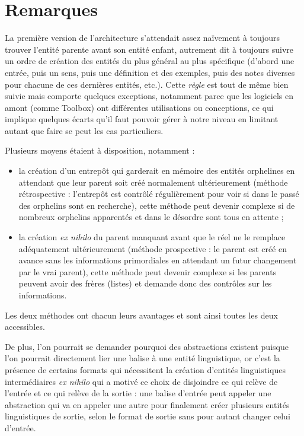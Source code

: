\documentclass[10pt]{report}
\newcommand{\balise}[1]{\textcolor{red!80}{#1}}
\newcommand{\entité}[1]{\textcolor{blue!80!black}{#1}}
\newcommand{\abstraction}[1]{\textcolor{blue!50!red}{#1}}
\begin{document}
\section{Remarques}

La première version de l’architecture s’attendait assez naïvement à toujours trouver l’entité parente avant son entité enfant, autrement dit à toujours suivre un ordre de création des entités du plus général au plus spécifique (d’abord une entrée, puis un sens, puis une définition et des exemples, puis des notes diverses pour chacune de ces dernières entités, etc.). Cette \textit{règle} est tout de même bien suivie mais comporte quelques exceptions, notamment parce que les logiciels en amont (comme Toolbox) ont différentes utilisations ou conceptions, ce qui implique quelques écarts qu’il faut pouvoir gérer à notre niveau en limitant autant que faire se peut les cas particuliers.

\bigskip

Plusieurs moyens étaient à disposition, notamment :
\begin{itemize}
	\item la création d’un entrepôt qui garderait en mémoire des entités orphelines en attendant que leur parent soit créé normalement ultérieurement (méthode rétrospective : l’entrepôt est contrôlé régulièrement pour voir si dans le passé des orphelins sont en recherche), cette méthode peut devenir complexe si de nombreux orphelins apparentés et dans le désordre sont tous en attente ;
	\item la création \textit{ex nihilo} du parent manquant avant que le réel ne le remplace adéquatement ultérieurement (méthode prospective : le parent est créé en avance sans les informations primordiales en attendant un futur changement par le vrai parent), cette méthode peut devenir complexe si les parents peuvent avoir des frères (listes) et demande donc des contrôles sur les informations.
\end{itemize} 

Les deux méthodes ont chacun leurs avantages et sont ainsi toutes les deux accessibles. 

\bigskip

De plus, l’on pourrait se demander pourquoi des \abstraction{abstractions} existent puisque l’on pourrait directement lier une \balise{balise} à une \entité{entité linguistique}, or c’est la présence de certains formats qui nécessitent la création d’\entité{entités linguistiques intermédiaires} \textit{ex nihilo} qui a motivé ce choix de disjoindre ce qui relève de l’entrée et ce qui relève de la sortie : une \balise{balise} d’entrée peut appeler une \abstraction{abstraction} qui va en appeler une \abstraction{autre} pour finalement créer plusieurs \entité{entités linguistiques} de sortie, selon le format de sortie sans pour autant changer celui d’entrée.
\end{document}
